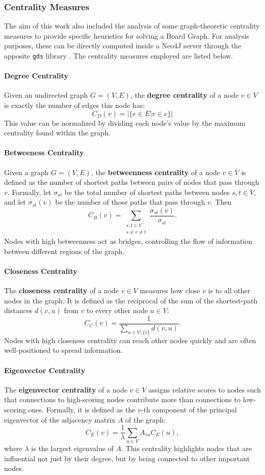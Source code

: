 \documentclass[conference]{IEEEtran}
\begin{document}
\subsubsection{Centrality Measures}
The aim of this work also included the analysis of some graph-theoretic centrality measures to provide specific heuristics for solving a Board Graph. For analysis purposes, these can be directly computed inside a Neo4J server through the apposite \texttt{gds} library \cite{gds}. The centrality measures employed are listed below.

\paragraph{Degree Centrality} Given an undirected graph $G = (V, E)$, the \textbf{degree centrality} of a node $v \in V$ is exactly the number of edges this node has:
$$
	C_D(v) = |\{e \in E | v \in e\}|
$$
This value can be normalized by dividing each node's value by the maximum centrality found within the graph.

\paragraph{Betweeness Centrality}
Given a graph $G = (V, E)$, the \textbf{betweenness centrality} of a node $v \in V$ is defined as the number of shortest paths between pairs of nodes that pass through $v$. 
Formally, let $\sigma_{st}$ be the total number of shortest paths between nodes $s, t \in V$, and let $\sigma_{st}(v)$ be the number of those paths that pass through $v$. 
Then
$$
C_B(v) = \sum_{\substack{s, t \in V \\ s \neq v \neq t}} \frac{\sigma_{st}(v)}{\sigma_{st}}.
$$
Nodes with high betweenness act as bridges, controlling the flow of information between different regions of the graph.

\paragraph{Closeness Centrality} 
The \textbf{closeness centrality} of a node $v \in V$ measures how close $v$ is to all other nodes in the graph. 
It is defined as the reciprocal of the sum of the shortest-path distances $d(v,u)$ from $v$ to every other node $u \in V$: 
$$
C_C(v) = \frac{1}{\sum_{u \in V \setminus \{v\}} d(v, u)}.
$$
Nodes with high closeness centrality can reach other nodes quickly and are often well-positioned to spread information.

\paragraph{Eigenvector Centrality} 
The \textbf{eigenvector centrality} of a node $v \in V$ assigns relative scores to nodes such that connections to high-scoring nodes contribute more than connections to low-scoring ones. 
Formally, it is defined as the $v$-th component of the principal eigenvector of the adjacency matrix $A$ of the graph:
$$
C_E(v) = \frac{1}{\lambda} \sum_{u \in V} A_{vu} C_E(u),
$$
where $\lambda$ is the largest eigenvalue of $A$. 
This centrality highlights nodes that are influential not just by their degree, but by being connected to other important nodes.
\end{document}
